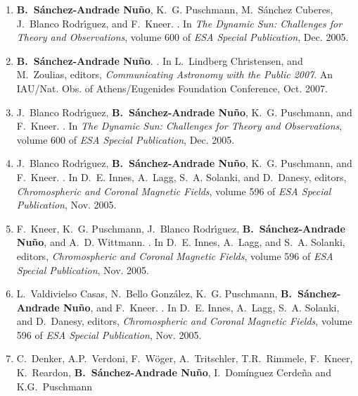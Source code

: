 \documentclass[goettingen,print,hyper]{thesis}
\begin{document}
\begin{enumerate}
\item
\textbf{B.~{S{\'a}nchez-Andrade Nu{\~n}o}}, K.~G. {Puschmann}, M.~{S{\'a}nchez Cuberes},
  J.~{Blanco Rodr{\'{\i}}guez}, and F.~{Kneer}.
.
\newblock In {\em The Dynamic Sun: Challenges for Theory and Observations},
  volume 600 of {\em ESA Special Publication}, Dec. 2005.
\item
\textbf{B.~{S{\'a}nchez-Andrade Nu{\~n}o}}. 
.
\newblock  In L.~Lindberg Christensen, and M.~Zoulias, editors, {\em
  Communicating Astronomy with the Public 2007}. An IAU/Nat. Obs. of Athens/Eugenides Foundation Conference,  {\em } Oct. 2007.
  

\item
J.~{Blanco Rodr{\'{\i}}guez}, \textbf{B.~{S{\'a}nchez-Andrade Nu{\~n}o}}, K.~G.
  {Puschmann}, and F.~{Kneer}.
.
\newblock In {\em The Dynamic Sun: Challenges for Theory and Observations},
  volume 600 of {\em ESA Special Publication}, Dec. 2005.

\item
J.~{Blanco Rodr{\'{\i}}guez}, \textbf{B.~{S{\'a}nchez-Andrade Nu{\~n}o}}, K.~G.
  {Puschmann}, and F.~{Kneer}.
.
\newblock In D.~E. {Innes}, A.~{Lagg}, S.~A. {Solanki}, and D.~Danesy, editors, {\em
  Chromospheric and Coronal Magnetic Fields}, volume 596 of {\em ESA Special
  Publication}, Nov. 2005.

\item
F.~{Kneer}, K.~G. {Puschmann}, J.~{Blanco Rodr{\'{\i}}guez},
  \textbf{B.~{S{\'a}nchez-Andrade Nu{\~n}o}}, and A.~D. {Wittmann}.
.
\newblock In D.~E. {Innes}, A.~{Lagg}, and S.~A. {Solanki}, editors, {\em
  Chromospheric and Coronal Magnetic Fields}, volume 596 of {\em ESA Special
  Publication}, Nov. 2005.

\item
L.~{Valdivielso Casas}, N.~{Bello Gonz{\'a}lez}, K.~G. {Puschmann},
  \textbf{B.~{S{\'a}nchez-Andrade Nu{\~n}o}}, and F.~{Kneer}.
.
\newblock In D.~E. {Innes}, A.~{Lagg}, S.~A. {Solanki}, and D.~Danesy, editors, {\em
  Chromospheric and Coronal Magnetic Fields}, volume 596 of {\em ESA Special
  Publication}, Nov. 2005.
\item
C.~Denker, A.P.~Verdoni, F.~W\"oger, A.~Tritschler, T.R.~Rimmele, F.~Kneer,
K.~Reardon, \textbf{B.~S\'anchez-Andrade Nu\~no}, I.~Dom\'inguez Cerde\~na and K.G.~Puschmann
  
  \thispagestyle{empty}
\end{enumerate}
\end{document}
